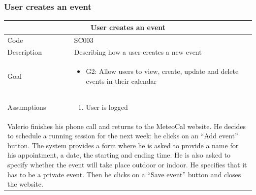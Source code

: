 \documentclass[10pt,a4paper,titlepage]{article}
\begin{document}
\subsubsection{User creates an event}
\begin{tabular}{| p{3cm} | p{10cm} |}
\hline \multicolumn{2}{|c|}{\textbf{User creates an event}} \\ 
\hline Code & SC003 \\ 
\hline Description & Describing how a user creates a new event\\
\hline Goal & \begin{itemize}\item G2: Allow users to view, create, update and delete events in their calendar\end{itemize}\\
\hline Assumptions & \begin{enumerate}
\item User is logged
\end{enumerate} \\
\hline \multicolumn{2}{|p{13cm}|}{Valerio finishes his phone call and returns to the MeteoCal website. He decides to schedule a running session for the next week: he clicks on an “Add event” button. The system provides a form where he is asked to provide a name for his appointment, a date, the starting and ending time. He is also asked to specify whether the event will take place outdoor or indoor. He specifies that it has to be a private event. Then he clicks on a “Save event” button and closes the website.}\\
\hline
\end{tabular}
\end{document}
